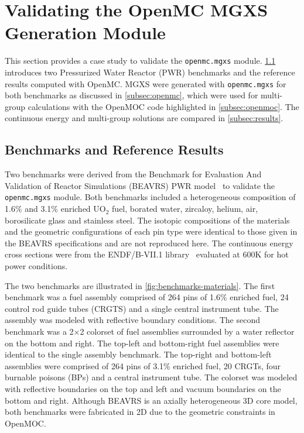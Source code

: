 \section{Validating the OpenMC MGXS Generation Module}
\label{sec:validate}

This section provides a case study to validate the \texttt{openmc.mgxs} module. \cref{subsec:benchmarks} introduces two Pressurized Water Reactor (PWR) benchmarks and the reference results computed with OpenMC. MGXS were generated with \texttt{openmc.mgxs} for both benchmarks as discussed in \cref{subsec:openmc}, which were used for multi-group calculations with the OpenMOC code highlighted in \cref{subsec:openmoc}. The continuous energy and multi-group solutions are compared in \cref{subsec:results}.


\subsection{Benchmarks and Reference Results}
\label{subsec:benchmarks}

Two benchmarks were derived from the Benchmark for Evaluation And Validation of Reactor Simulations (BEAVRS) PWR model~\cite{horelik2013beavrs} to validate the \texttt{openmc.mgxs} module. Both benchmarks included a heterogeneous composition of 1.6\% and 3.1\% enriched UO$_2$ fuel, borated water, zircaloy, helium, air, borosilicate glass and stainless steel. The isotopic compositions of the materials and the geometric configurations of each pin type were identical to those given in the BEAVRS specifications and are not reproduced here. The continuous energy cross sections were from the ENDF/B-VII.1 library~\cite{mcnpx2003manual} evaluated at 600K for hot power conditions.

The two benchmarks are illustrated in \cref{fig:benchmarks-materials}. The first benchmark was a fuel assembly comprised of 264 pins of 1.6\% enriched fuel, 24 control rod guide tubes (CRGTS) and a single central instrument tube. The assembly was modeled with reflective boundary conditions. The second benchmark was a 2$\times$2 colorset of fuel assemblies surrounded by a water reflector on the bottom and right. The top-left and bottom-right fuel assemblies were identical to the single assembly benchmark. The top-right and bottom-left assemblies were comprised of 264 pins of 3.1\% enriched fuel, 20 CRGTs, four burnable poisons (BPs) and a central instrument tube. The colorset was modeled with reflective boundaries on the top and left and vacuum boundaries on the bottom and right. Although BEAVRS is an axially heterogeneous 3D core model, both benchmarks were fabricated in 2D due to the geometric constraints in OpenMOC.

